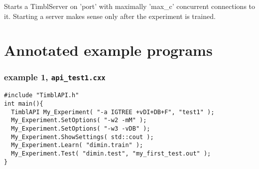 \documentclass{report}
\begin{document}
Starts a TimblServer on 'port' with maximally 'max\_c' concurrent
connections to it. Starting a server makes sense only after the
experiment is trained.

\clearpage
\chapter{Annotated example programs}

\subsection{example 1, {\tt api\_test1.cxx}}
\begin{footnotesize}
\begin{verbatim}	
#include "TimblAPI.h"
int main(){
  TimblAPI My_Experiment( "-a IGTREE +vDI+DB+F", "test1" );
  My_Experiment.SetOptions( "-w2 -mM" );
  My_Experiment.SetOptions( "-w3 -vDB" );
  My_Experiment.ShowSettings( std::cout );
  My_Experiment.Learn( "dimin.train" );  
  My_Experiment.Test( "dimin.test", "my_first_test.out" );  
}
\end{verbatim}
\end{footnotesize}
\end{document}
